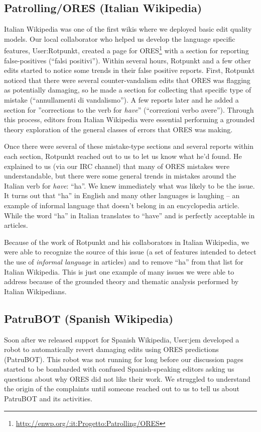 \subsection{Patrolling/ORES (Italian Wikipedia)}
Italian Wikipedia was one of the first wikis where we deployed basic edit quality models.  Our local collaborator who helped us develop the language specific features, User:Rotpunkt, created a page for ORES\footnote{\url{http://enwp.org/:it:Progetto:Patrolling/ORES}} with a section for reporting false-positives (``falsi positivi'').  Within several hours, Rotpunkt and a few other edits started to notice some trends in their false positive reports.  First, Rotpunkt noticed that there were several counter-vandalism edits that ORES was flagging as potentially damaging, so he made a section for collecting that specific type of mistake (``annullamenti di vandalismo'').  A few reports later and he added a section for ''corrections to the verb for \emph{have}'' (``correzioni verbo avere'').  Through this process, editors from Italian Wikipedia were essential performing a grounded theory exploration of the general classes of errors that ORES was making.

Once there were several of these mistake-type sections and several reports within each section, Rotpunkt reached out to us to let us know what he'd found.  He explained to us (via our IRC channel) that many of ORES mistakes were understandable, but there were some general trends in mistakes around the Italian verb for \emph{have}: ``ha''.  We knew immediately what was likely to be the issue.  It turns out that ``ha'' in English and many other languages is laughing -- an example of informal language that doesn't belong in an encyclopedia article.  While the word ``ha'' in Italian translates to ``have'' and is perfectly acceptable in articles.

Because of the work of Rotpunkt and his collaborators in Italian Wikipedia, we were able to recognize the source of this issue (a set of features intended to detect the use of \emph{informal language} in articles) and to remove ``ha'' from that list for Italian Wikipedia.  This is just one example of many issues we were able to address because of the grounded theory and thematic analysis performed by Italian Wikipedians.

\subsection{PatruBOT (Spanish Wikipedia)}
Soon after we released support for Spanish Wikipedia, User:jem developed a robot to automatically revert damaging edits using ORES predictions (PatruBOT).  This robot was not running for long before our discussion pages started to be bombarded with confused Spanish-speaking editors asking us questions about why ORES did not like their work.  We struggled to understand the origin of the complaints until someone reached out to us to tell us about PatruBOT and its activities.

